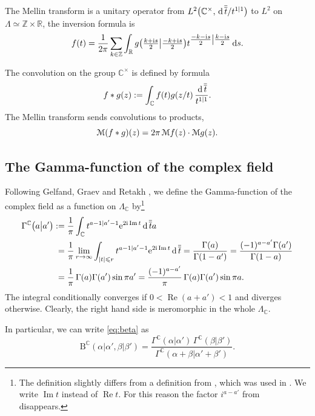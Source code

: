 \documentclass[pdftex]{sigma}
\numberwithin{equation}{section}
\renewcommand{\Re}{\mathop {\mathrm {Re}}\nolimits}
\renewcommand{\Re}{\mathop {\mathrm {Re}}\nolimits}
\renewcommand{\Im}{\mathop {\mathrm {Im}}\nolimits}
\def\R {{\mathbb R }}
\def\C {{\mathbb C }}
\def\Z{{\mathbb Z}}
\def\cM{\EuScript M}
\def\le{\leqslant}
\def\B{\mathrm B}
\newcommand{\dd}[1]{\,{\rm d}\,{\overline{\overline{#1}}} }
\def\B{\mathrm{B}}
\begin{document}
The Mellin transform is a unitary operator from
$L^2\big(\C^\times,{\dd t}/{t^{1|1}} \big)$
to $L^2$ on $\Lambda\simeq \Z\times\R$, the inversion formula is
\begin{equation*}
f(t)=\frac 1{2\pi}\sum_{k\in\Z} \int_\R g\big(\tfrac{k+{\rm i}s}2\big|\tfrac{-k+{\rm i}s}2\big) t^{{\tfrac{-k-{\rm i}s}2\big|\tfrac{k-{\rm i}s}2} }\,{\rm d}s.
\end{equation*}

The convolution on the group
$\C^\times$ is defined by formula
\[ f*g(z):=\int_\C f(t)g(z/t)\,\frac{\dd t}{t^{1|1}}.
\]
The Mellin transform sends convolutions to products,
\[
\cM (f*g)(z)=2\pi\, \cM f(z)\cdot \cM g(z).
\]

\subsection{The Gamma-function of the complex field}\label{ss:Gamma}
Following Gelfand, Graev and Retakh \cite{GGR},
we define the Gamma-function of the complex field as
a function on $\Lambda_\C$ by\footnote{The definition slightly
differs from a definition from \cite{GGR}, which was used in
\cite{MN,Ner-doug}. We write $\Im t$ instead of $\Re t$. For this reason
the factor $i^{a-a'}$ from \cite{GGR,MN} disappears.}
\begin{align}
\Gamma^\C\big(a\big|a'\big)&:=
\frac 1\pi \int_\C t^{a-1|a'-1} {\rm e}^{2{\rm i} \Im t}\dd ta \notag\\
&\hphantom{:}=
\frac{1}{\pi} \lim_{r\to\infty} \int_{|t|\le r} t^{a-1|a'-1}
{\rm e}^{2{\rm i} \Im t}\dd t
= \frac{\Gamma(a)}{\Gamma(1-a')}
=\frac{(-1)^{a-a'}\Gamma(a')}{\Gamma(1-a)} \notag \\
&\hphantom{:}= \frac{1}{\pi}\,
\Gamma(a)\Gamma(a')\sin\pi a'
= \frac{(-1)^{a-a'}}{\pi} \,\Gamma(a)\Gamma(a')\sin\pi a. \label{eq:Gamma}
\end{align}
The integral conditionally converges if $0<\Re(a+a')<1$
and diverges otherwise. Clearly, the right hand side is meromorphic
in the whole $\Lambda_\C$.

\begin{Remark} In particular, we can write \eqref{eq:beta} as
\[
\B^\C(\alpha|\alpha',\beta|\beta')=
\frac{\Gamma^\C(\alpha|\alpha')\,\Gamma^\C(\beta|\beta')}
{\Gamma^\C(\alpha+\beta|\alpha'+\beta')}.
\]
\end{Remark}
\end{document}
